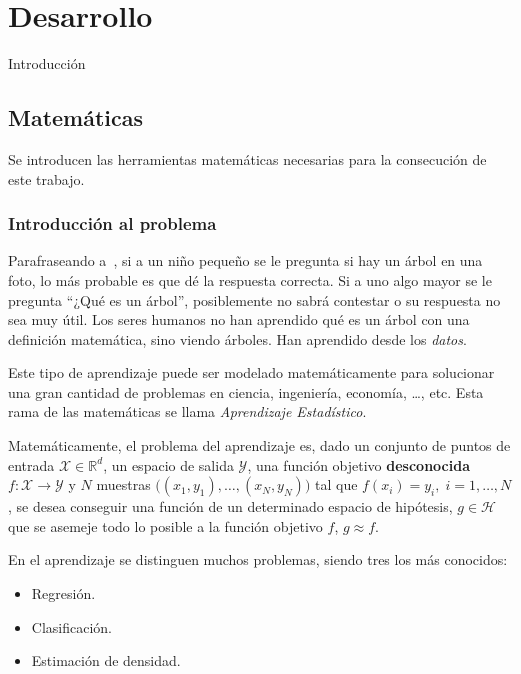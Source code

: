 \documentclass[a4paper,11pt]{book}\usepackage[]{graphicx}\usepackage[]{color}
\begin{document}
\chapter{Desarrollo}


Introducción

\section{Matemáticas}

Se introducen las herramientas matemáticas necesarias para la consecución de este trabajo.



\subsection{Introducción al problema}

Parafraseando a~\cite{Abu-Mostafa:2012:LD:2207825}, si a un niño pequeño se le pregunta si hay un árbol
en una foto, lo más probable es que dé la respuesta correcta. Si a uno algo mayor
se le pregunta ``¿Qué es un árbol'', posiblemente no sabrá contestar o su respuesta
no sea muy útil. Los seres humanos no han aprendido qué es un árbol con una definición
matemática, sino viendo árboles. Han aprendido desde los \emph{datos}.

Este tipo de aprendizaje puede ser modelado matemáticamente para solucionar una gran
cantidad de problemas en ciencia, ingeniería, economía, \ldots, etc. Esta rama de
las matemáticas se llama \emph{Aprendizaje Estadístico}.

Matemáticamente, el problema del aprendizaje es, dado un conjunto de puntos de entrada
$\mathcal{X} \in \mathbb{R}^d$, un espacio de salida $\mathcal{Y}$, una función objetivo
\textbf{desconocida}$f:\mathcal{X} \rightarrow \mathcal{Y}$ y $N$ muestras
$\big((x_1,y_1),\ldots,(x_N,y_N) \big)$
tal que $f(x_i) = y_i, \; i = 1,\ldots,N$,
se desea conseguir una función de un determinado espacio de hipótesis,
$g \in \mathcal{H}$ que se asemeje todo lo posible a la función objetivo
$f$, $g \approx f$.


En el aprendizaje se distinguen muchos problemas, siendo tres los más conocidos:
\begin{itemize}
  \item Regresión.
  \item Clasificación.
  \item Estimación de densidad.
\end{itemize}
\end{document}
